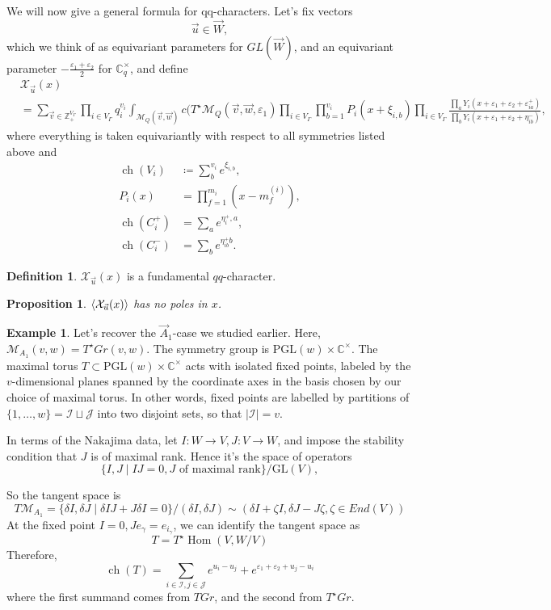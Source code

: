 \documentclass[leqno, openany]{memoir}
\newtheorem{prop}[thm]{Proposition}
\theoremstyle{definition}
\newtheorem{defn}[thm]{Definition}
\newtheorem{exm}[thm]{Example}
\theoremstyle{remark}
\theoremstyle{plain}
\theoremstyle{definition}
\theoremstyle{remark}
\newcommand{\ep}{\varepsilon}
\newcommand{\mc}[1]{\mathcal{#1}}
\newcommand{\mr}[1]{\mathrm{#1}}
\newcommand{\GL}{\mr{GL}}
\newcommand{\PGL}{\mr{PGL}}
\DeclareMathOperator{\Hom}{Hom}
\DeclareMathOperator{\ch}{ch}
\begin{document}
We will now give a general formula for qq-characters. 
Let's fix vectors 
\[
\vec{u} \in \vec{W},
\]
which we think of as equivariant parameters for $GL(\vec{W})$, and an equivariant parameter $-\frac{\ep_1 + \ep_2}{2}$ for $\mathbb{C}^\times_q$, and define 
\begin{align*}
    &\mathcal{X}_{\vec{u}}(x) \\&= \sum_{\vec{v} \in \mathbb{Z}^{V_\Gamma}_+}\prod_{i \in V_\Gamma} q_i^{v_i}  \int_{\mathcal{M}_Q(\vec{v},\vec{w})} c(T^\star \mathcal{M}_Q(\vec{v},\vec{w}, \ep_1) \prod_{i \in V_\Gamma} \prod_{b = 1}^{v_i} P_i(x + \xi_{i, b}) \prod_{i \in V_\Gamma} \frac{\prod_a Y_i (x + \ep_1 + \ep_2 + \ep_{ia}^+)}{\prod_b Y_i(x + \ep_1 + \ep_2 + \eta_{ib}^-)},
\end{align*}
where everything is taken equivariantly with respect to all symmetries listed above and
\begin{align*}
    \ch(V_i) &\coloneqq \sum_b^{v_i} e^{\xi_{i,b}}, \\
    P_i(x) &= \prod_{f = 1}^{m_i} (x - m_f^{(i)}), \\
    \ch(C_i^+) &= \sum_a e^{\eta_i^+,a}, \\
    \ch(C_i^-) &=\sum_b e^{\eta^+_{ib} b}.
\end{align*}


\begin{defn}
$\mathcal{X}_{\vec{u}}(x)$ is a fundamental $qq$-character. 
\end{defn}
\begin{prop}
$\ev{ \mathcal{X}_{\vec{u}}(x) }$ has no poles in $x$.
\end{prop}

\begin{exm}
    Let's recover the $\vec{A}_1$-case we studied earlier. Here, $\mc{M}_{A_1}(v,w) = T^\star Gr(v,w)$. The symmetry group is $\mr{PGL}(w) \times \mathbb{C}^\times$. 
The maximal torus $T \subset \PGL(w) \times \mathbb{C}^\times$ acts with isolated fixed points, labeled by the $v$-dimensional planes spanned by the coordinate axes in the basis chosen by our choice of maximal torus. 
In other words, fixed points are labelled by partitions of $\{1,\dots,w\} = \mathcal{I} \sqcup \mathcal{J}$ into two disjoint sets, so that $|\mathcal{I}| = v$. 

In terms of the Nakajima data, let $I : W \to V, J : V \to W$, and impose the stability condition that $J$ is of maximal rank.
Hence it's the space of operators 
\[
\{ I,J \mid IJ =0, J\text{ of maximal rank}\}/\GL(V),
\]

So the tangent space is 
\[
T\mathcal{M}_{A_1} = \{ \delta I, \delta J \mid  \delta I J + J \delta I = 0\}/(\delta I , \delta J) \sim (\delta I + \zeta I, \delta J  - J \zeta, \zeta \in End(V))
\]
At the fixed point $I = 0, Je_\gamma = e_{i_\gamma}$, we can identify the tangent space as 
\[
T = T^\star \Hom(V,W/V)
\]
Therefore, 
\[
\ch(T) = \sum_{i \in \mathcal{I}, j \in \mathcal{J}} e^{u_i - u_j} + e^{\ep_1 + \ep_2 + u_j - u_i}
\]
where the first summand comes from $TGr$, and the second from $T^\star Gr$.
\end{exm}
\end{document}
